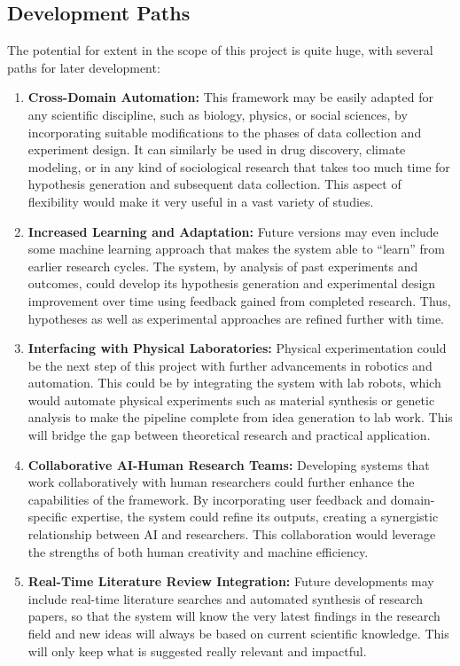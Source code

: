 \subsection{Development Paths}
The potential for extent in the scope of this project is quite huge, with several paths for later development:
\begin{enumerate}
    \item \textbf{Cross-Domain Automation:}
    This framework may be easily adapted for any scientific discipline, such as biology, physics, or social sciences, by incorporating suitable modifications to the phases of data collection and experiment design. It can similarly be used in drug discovery, climate modeling, or in any kind of sociological research that takes too much time for hypothesis generation and subsequent data collection. This aspect of flexibility would make it very useful in a vast variety of studies.
    
    \item \textbf{Increased Learning and Adaptation:}
    Future versions may even include some machine learning approach that makes the system able to ``learn'' from earlier research cycles. The system, by analysis of past experiments and outcomes, could develop its hypothesis generation and experimental design improvement over time using feedback gained from completed research. Thus, hypotheses as well as experimental approaches are refined further with time.
    
    \item \textbf{Interfacing with Physical Laboratories:}
    Physical experimentation could be the next step of this project with further advancements in robotics and automation. This could be by integrating the system with lab robots, which would automate physical experiments such as material synthesis or genetic analysis to make the pipeline complete from idea generation to lab work. This will bridge the gap between theoretical research and practical application.
    
    \item \textbf{Collaborative AI-Human Research Teams:}
    Developing systems that work collaboratively with human researchers could further enhance the capabilities of the framework. By incorporating user feedback and domain-specific expertise, the system could refine its outputs, creating a synergistic relationship between AI and researchers. This collaboration would leverage the strengths of both human creativity and machine efficiency.
    
    \item \textbf{Real-Time Literature Review Integration:}
    Future developments may include real-time literature searches and automated synthesis of research papers, so that the system will know the very latest findings in the research field and new ideas will always be based on current scientific knowledge. This will only keep what is suggested really relevant and impactful.
    \end{enumerate}



